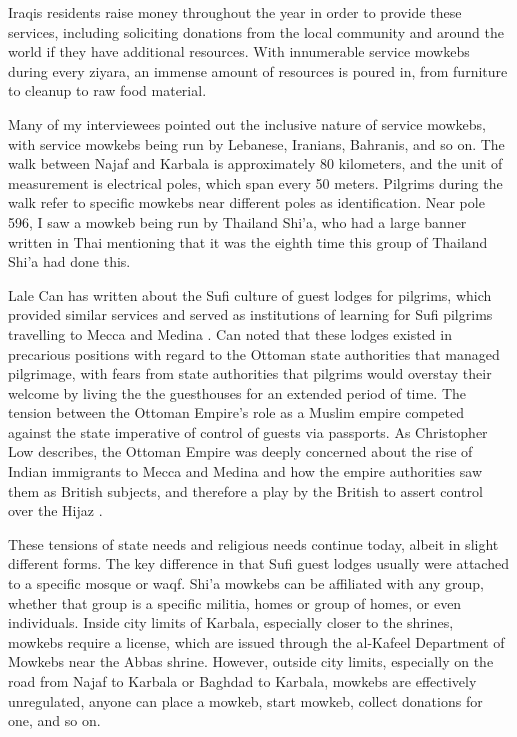 Iraqis residents raise money throughout the year in order to provide these services, including soliciting donations from the local community and around the world if they have additional resources. With innumerable service mowkebs during every ziyara, an immense amount of resources is poured in, from furniture to cleanup to raw food material.

Many of my interviewees pointed out the inclusive nature of service mowkebs, with service mowkebs being run by Lebanese, Iranians, Bahranis, and so on. The walk between Najaf and Karbala is approximately 80 kilometers, and the unit of measurement is electrical poles, which span every 50 meters. Pilgrims during the walk refer to specific mowkebs near different poles as identification. Near pole 596, I saw a mowkeb being run by Thailand Shi'a, who had a large banner written in Thai mentioning that it was the eighth time this group of Thailand Shi'a had done this. 

Lale Can has written about the Sufi culture of guest lodges for pilgrims, which provided similar services and served as institutions of learning for Sufi pilgrims travelling to Mecca and Medina \cite{can_spiritual_2020}. Can noted that these lodges existed in precarious positions with regard to the Ottoman state authorities that managed pilgrimage, with fears from state authorities that pilgrims would overstay their welcome by living the the guesthouses for an extended period of time. The tension between the Ottoman Empire's role as a Muslim empire competed against the state imperative of control of guests via passports. As Christopher Low describes, the Ottoman Empire was deeply concerned about the rise of Indian immigrants to Mecca and Medina and how the empire authorities saw them as British subjects, and therefore a play by the British to assert control over the Hijaz \cite{low_imperial_2020}. 

These tensions of state needs and religious needs continue today, albeit in slight different forms. The key difference in that Sufi guest lodges usually were attached to a specific mosque or waqf. Shi'a mowkebs can be affiliated with any group, whether that group is a specific militia, homes or group of homes, or even individuals. Inside city limits of Karbala, especially closer to the shrines, mowkebs require a license, which are issued through the al-Kafeel Department of Mowkebs near the Abbas shrine. However, outside city limits, especially on the road from Najaf to Karbala or Baghdad to Karbala, mowkebs are effectively unregulated, anyone can place a mowkeb, start mowkeb, collect donations for one, and so on. 

